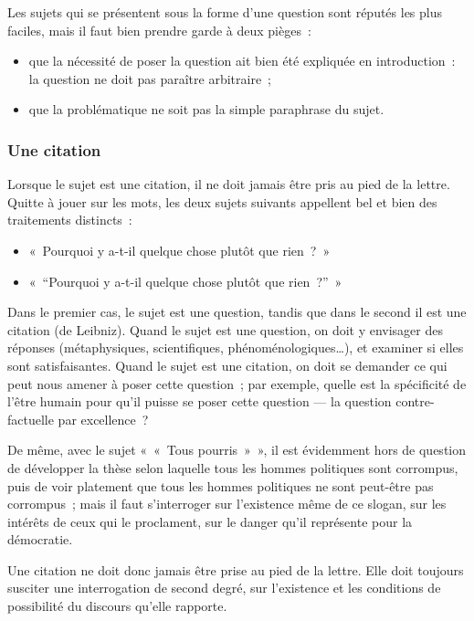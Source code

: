 \documentclass[a4paper]{article}
\begin{document}
Les sujets qui se présentent sous la forme d'une question sont réputés
les plus faciles, mais il faut bien prendre garde à deux pièges :

\begin{itemize}
\item que la nécessité de poser la question ait bien été expliquée en
introduction : la question ne doit pas paraître arbitraire ;

\item que la problématique ne soit pas la simple paraphrase du sujet.
\end{itemize}

\subsubsection{Une citation}
\label{sec-2-3-4}

Lorsque le sujet est une citation, il ne doit jamais être pris au pied
de la lettre. Quitte à jouer sur les mots, les deux sujets suivants
appellent bel et bien des traitements distincts :

\begin{itemize}
\item « Pourquoi y a-t-il quelque chose plutôt que rien ? »

\item « ``Pourquoi y a-t-il quelque chose plutôt que rien ?'' »
\end{itemize}

Dans le premier cas, le sujet est une question, tandis que dans le
second il est une citation (de Leibniz). Quand le sujet est une
question, on doit y envisager des réponses (métaphysiques,
scientifiques, phénoménologiques\ldots{}), et examiner si elles sont
satisfaisantes. Quand le sujet est une citation, on doit se demander ce
qui peut nous amener à poser cette question ; par exemple, quelle est la
spécificité de l'être humain pour qu'il puisse se poser cette question
--- la question contre-factuelle par excellence ?

De même, avec le sujet « « Tous pourris » », il est évidemment hors de
question de développer la thèse selon laquelle tous les hommes
politiques sont corrompus, puis de voir platement que tous les hommes
politiques ne sont peut-être pas corrompus ; mais il faut s'interroger
sur l'existence même de ce slogan, sur les intérêts de ceux qui le
proclament, sur le danger qu'il représente pour la démocratie.

Une citation ne doit donc jamais être prise au pied de la lettre. Elle
doit toujours susciter une interrogation de second degré, sur
l'existence et les conditions de possibilité du discours qu'elle
rapporte.
\end{document}
